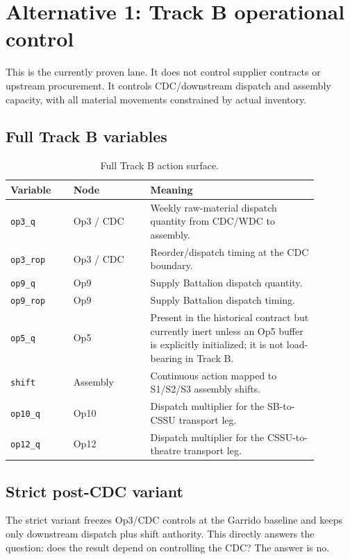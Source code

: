 \documentclass[11pt]{article}
\begin{document}
\section*{Alternative 1: Track B operational control}

This is the currently proven lane. It does not control supplier contracts or
upstream procurement. It controls CDC/downstream dispatch and assembly
capacity, with all material movements constrained by actual inventory.

\subsection*{Full Track B variables}

\begin{table}[ht]
\centering
\small
\begin{tabular}{p{0.18\linewidth}p{0.22\linewidth}p{0.48\linewidth}}
\toprule
\textbf{Variable} & \textbf{Node} & \textbf{Meaning} \\
\midrule
\texttt{op3\_q} & Op3 / CDC & Weekly raw-material dispatch quantity from CDC/WDC to assembly. \\
\texttt{op3\_rop} & Op3 / CDC & Reorder/dispatch timing at the CDC boundary. \\
\texttt{op9\_q} & Op9 & Supply Battalion dispatch quantity. \\
\texttt{op9\_rop} & Op9 & Supply Battalion dispatch timing. \\
\texttt{op5\_q} & Op5 & Present in the historical contract but currently inert unless an Op5 buffer is explicitly initialized; it is not load-bearing in Track B. \\
\texttt{shift} & Assembly & Continuous action mapped to S1/S2/S3 assembly shifts. \\
\texttt{op10\_q} & Op10 & Dispatch multiplier for the SB-to-CSSU transport leg. \\
\texttt{op12\_q} & Op12 & Dispatch multiplier for the CSSU-to-theatre transport leg. \\
\bottomrule
\end{tabular}
\caption{Full Track B action surface.}
\end{table}

\subsection*{Strict post-CDC variant}

The strict variant freezes Op3/CDC controls at the Garrido baseline and keeps
only downstream dispatch plus shift authority. This directly answers the
question: does the result depend on controlling the CDC? The answer is no.
\end{document}
